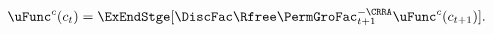   \begin{equation}\begin{gathered}\begin{aligned}
        \uFunc^{{c}}({c}_{t})  & = \ExEndStge[\DiscFac\Rfree \PermGroFac_{t+1}^{-\CRRA}\uFunc^{{c}}({c}_{t+1})]. \label{eq:cEuler}
                                  \end{aligned}\end{gathered}\end{equation}
